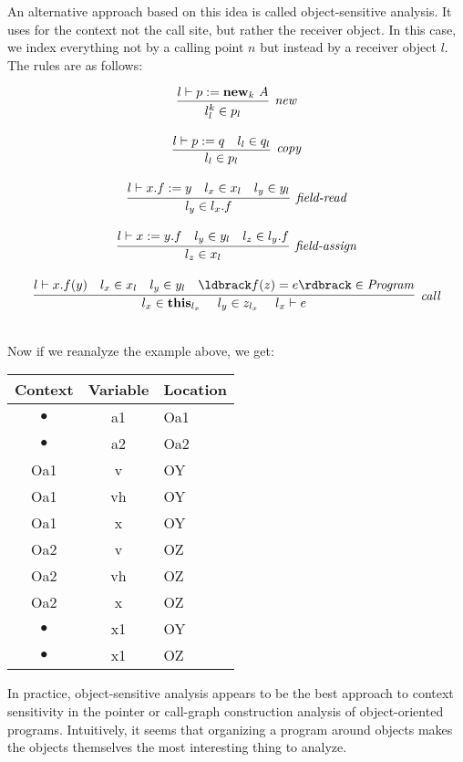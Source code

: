 \documentclass[11pt]{article}
\newcommand{\parg}[1] %
  {\ldbrack #1 \rdbrack}
\def\tablespace{\vspace{2ex}}
\begin{document}
\begin{sloppypar}
An alternative approach based on this idea is called object-sensitive analysis.  It uses for the context not the call site, but rather the receiver object.  In this case, we index everything not by a calling point $n$ but instead by a receiver object $l$.  The rules are as follows:

\[
\begin{array}{c}
\infer[\textit{new}]
	{l^k_l \in p_l}
	{l \vdash p := \mathbf{new}_k~A}\\[3ex]

\infer[\textit{copy}]
	{l_l \in p_l}
	{l \vdash p := q & l_l \in q_l}\\[3ex]
		
\infer[\textit{field-read}]
	{l_y \in l_x.f}
	{l \vdash x.f := y & l_x \in x_l & l_y \in y_l}\\[3ex]
	
\infer[\textit{field-assign}]
	{l_z \in x_l}
	{l \vdash x := y.f & l_y \in y_l & l_z \in l_y.f}\\[3ex]
	
\infer[\textit{call}]
	{l_x \in \mathbf{this}_{l_x} ~~~~ l_y \in z_{l_x} ~~~~ l_x \vdash e}
	{l \vdash x.f(y) & l_x \in x_l & l_y \in y_l & \parg{f(z) = e} \in \mathit{Program}}\\[3ex]
	
\end{array}
\]


Now if we reanalyze the example above, we get:

\tablespace
\begin{tabular}{c | c | l}

Context & Variable & Location \\
\hline
$\bullet$ & a1 & Oa1 \\
$\bullet$ & a2 & Oa2 \\
Oa1 & v  & OY \\
Oa1 & vh & OY \\
Oa1 & x  & OY \\
Oa2 & v  & OZ \\
Oa2 & vh & OZ \\
Oa2 & x  & OZ \\
$\bullet$ & x1 & OY \\
$\bullet$ & x1 & OZ \\

\end{tabular}
\tablespace

In practice, object-sensitive analysis appears to be the best approach to context sensitivity in the pointer or call-graph construction analysis of object-oriented programs.  Intuitively, it seems that organizing a program around objects makes the objects themselves the most interesting thing to analyze.


\end{sloppypar}
\end{document}

